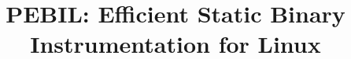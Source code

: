 \documentclass[a4paper,11pt,leqno,notitlepage,onecolumn]{article}
\begin{document}
\title{\bf{PEBIL: Efficient Static Binary Instrumentation for Linux}}
\date{}
\maketitle

\begin{abstract}

\end{abstract}















%



\end{document}

